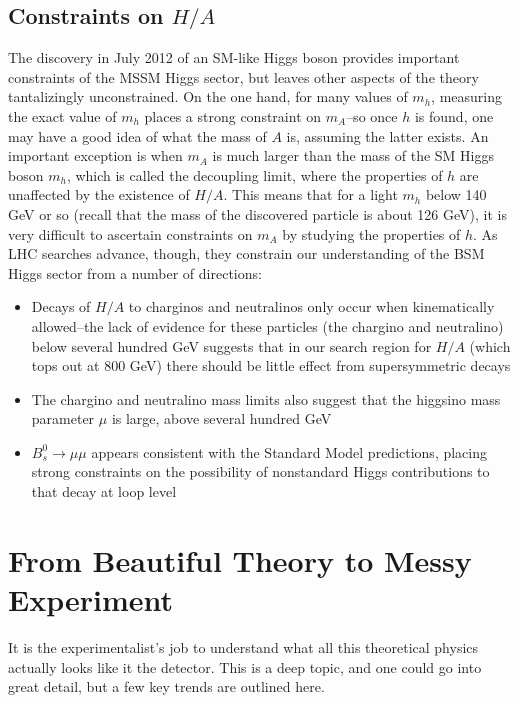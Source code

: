 \subsection{Constraints on $H/A$}
The discovery in July 2012 of an SM-like Higgs boson provides important constraints of the MSSM Higgs sector,
 but leaves other aspects of the theory tantalizingly unconstrained.  On the one hand, 
for many values of $m_h$, measuring the exact value of $m_h$ 
places a strong constraint on $m_A$--so once $h$ is found, one may have a good idea of what the mass of 
$A$ is, assuming the latter exists.  An important exception is when 
$m_A$ is much larger than the mass of the SM Higgs 
boson $m_h$, which is called the decoupling limit, where the 
properties of $h$ are unaffected by the existence of $H/A$.
  This means that for a light $m_h$ below 140 GeV 
or so (recall that the mass of the discovered particle is about 126 GeV),
 it is very difficult to ascertain constraints on $m_A$ by studying the properties of $h$.  
 As LHC searches advance, though, they constrain our understanding of the BSM 
 Higgs sector from a number of directions: 

\begin{itemize}
    \item Decays of $H/A$ to charginos and neutralinos only occur when kinematically 
allowed--the lack of evidence for these particles (the chargino and neutralino) below several hundred GeV suggests
that in our search region for $H/A$ (which tops out at 800 GeV) there should be little
effect from supersymmetric decays
    \item The chargino and neutralino mass limits also suggest that the higgsino mass
parameter $\mu$ is large, above several hundred GeV
    \item $B_s^0\rightarrow\mu\mu$ appears consistent with the Standard Model predictions,
placing strong constraints on the possibility of nonstandard Higgs contributions
to that decay at loop level \cite{bs_to_mumu}
\end{itemize}

\section{From Beautiful Theory to Messy Experiment}

It is the experimentalist's job to understand what all this theoretical physics actually 
looks like it the detector.  This is a deep topic, and one could 
go into great detail, but a few key trends are outlined here.

